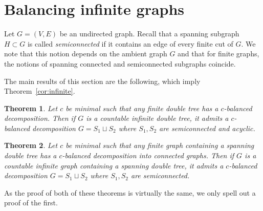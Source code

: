 \documentclass[11pt, reqno, a4paper]{article}
\newtheorem{theorem}{Theorem}
\theoremstyle{definition}
\numberwithin{equation}{section}
\begin{document}
\section{Balancing infinite graphs}\label{sec:semiconn}
Let $G = (V,E)$ be an undirected graph.
Recall that a spanning subgraph $H\subset G$ is called \emph{semiconnected} if it contains an edge of every finite cut of $G$.
We note that this notion depends on the ambient graph $G$ and that for finite graphs, the notions of spanning connected and semiconnected subgraphs coincide.

The main results of this section are the following, which imply Theorem~\ref{cor:infinite}.
\begin{theorem}\label{thm:semiconn}
Let $c$ be minimal such that any finite double tree has a $c$-balanced decomposition. 
Then if $G$ is a countable infinite double tree, it admits a $c$-balanced decomposition $G= S_1 \sqcup S_2$ where $S_1, S_2$ are semiconnected and acyclic.
\end{theorem}
\begin{theorem}\label{thm:semiconngeneral}
Let $c$ be minimal such that any finite graph containing a spanning double tree has a $c$-balanced decomposition into connected graphs. 
Then if $G$ is a countable infinite graph containing a spanning double tree, it admits a $c$-balanced decomposition $G= S_1 \sqcup S_2$ where $S_1, S_2$ are semiconnected.
\end{theorem}
As the proof of both of these theorems is virtually the same, we only spell out a proof of the first.
\end{document}
